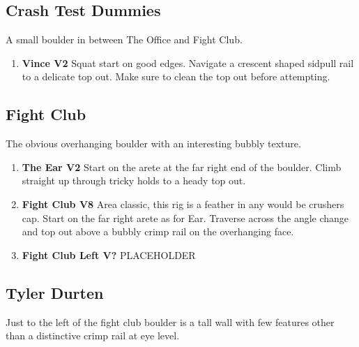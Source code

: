 \subsection*{Crash Test Dummies}\label{bf:Crash Test Dummies}
A small boulder in between The Office and Fight Club.

\begin{enumerate}[resume]
	\item\label{rt:Vince} \colorbox{green!20}{\textbf{Vince V2    } }
	\newline Squat start on good edges. Navigate a crescent shaped sidpull rail to a delicate top out. Make sure to clean the top out before attempting.\
\end{enumerate}
\subsection*{Fight Club}\label{bf:Fight Club}
The obvious overhanging boulder with an interesting bubbly texture.

\label{pt:Fight Club}
\begin{enumerate}[resume]
	\item\label{rt:The Ear} \colorbox{green!20}{\textbf{The Ear V2     } }
	\newline Start on the arete at the far right end of the boulder. Climb straight up through tricky holds to a heady top out.\
	\item\label{rt:Fight Club} \colorbox{Goldenrod!50}{\textbf{Fight Club V8     } }
	\newline Area classic, this rig is a feather in any would be crushers cap. Start on the far right arete as for Ear. Traverse across the angle change and top out above a bubbly crimp rail on the overhanging face.\
	\item\label{rt:Fight Club Left} \colorbox{black!20}{\textbf{Fight Club Left V?  } }
	\newline PLACEHOLDER\
\end{enumerate}
\subsection*{Tyler Durten}\label{bf:Tyler Durten}
Just to the left of the fight club boulder is a tall wall with few features other than a distinctive crimp rail at eye level.

